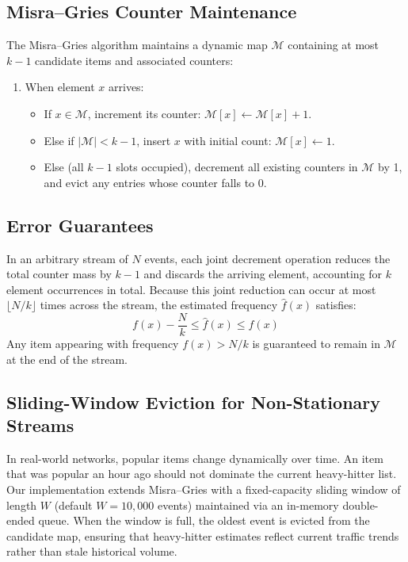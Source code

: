 \subsection{Misra--Gries Counter Maintenance}
The Misra--Gries algorithm maintains a dynamic map $\mathcal{M}$ containing at most $k-1$ candidate items and associated counters:
\begin{enumerate}
 \item When element $x$ arrives:
 \begin{itemize}
 \item If $x \in \mathcal{M}$, increment its counter: $\mathcal{M}[x] \leftarrow \mathcal{M}[x] + 1$.
 \item Else if $|\mathcal{M}| < k - 1$, insert $x$ with initial count: $\mathcal{M}[x] \leftarrow 1$.
 \item Else (all $k-1$ slots occupied), decrement all existing counters in $\mathcal{M}$ by 1, and evict any entries whose counter falls to 0.
 \end{itemize}
\end{enumerate}

\subsection{Error Guarantees}
In an arbitrary stream of $N$ events, each joint decrement operation reduces the total counter mass by $k-1$ and discards the arriving element, accounting for $k$ element occurrences in total. Because this joint reduction can occur at most $\lfloor N/k \rfloor$ times across the stream, the estimated frequency $\hat{f}(x)$ satisfies:
\begin{equation}
    f(x) - \frac{N}{k} \le \hat{f}(x) \le f(x)
\end{equation}
Any item appearing with frequency $f(x) > N/k$ is guaranteed to remain in $\mathcal{M}$ at the end of the stream.

\subsection{Sliding-Window Eviction for Non-Stationary Streams}
In real-world networks, popular items change dynamically over time. An item that was popular an hour ago should not dominate the current heavy-hitter list. Our implementation extends Misra--Gries with a fixed-capacity sliding window of length $W$ (default $W = 10,000$ events) maintained via an in-memory double-ended queue. When the window is full, the oldest event is evicted from the candidate map, ensuring that heavy-hitter estimates reflect current traffic trends rather than stale historical volume.

